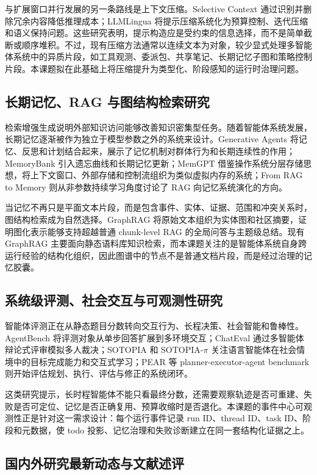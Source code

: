 \documentclass[UTF8,a4paper,zihao=-4,fontset=windows]{ctexart}
\begin{document}
与扩展窗口并行发展的另一条路线是上下文压缩。Selective Context 通过识别并删除冗余内容降低推理成本；LLMLingua 将提示压缩系统化为预算控制、迭代压缩和语义保持问题。这些研究表明，提示构造应是受约束的信息选择，而不是简单截断或顺序堆积。不过，现有压缩方法通常以连续文本为对象，较少显式处理多智能体系统中的异质片段，如工具观测、委派包、共享笔记、长期记忆子图和策略控制片段。本课题拟在此基础上将压缩提升为类型化、阶段感知的运行时治理问题。

\subsection{长期记忆、RAG 与图结构检索研究}

检索增强生成说明外部知识访问能够改善知识密集型任务。随着智能体系统发展，长期记忆逐渐被作为独立于模型参数之外的系统来设计。Generative Agents 将记忆、反思和计划结合起来，展示了记忆机制对群体行为和长期连续性的作用；MemoryBank 引入遗忘曲线和长期记忆更新；MemGPT 借鉴操作系统分层存储思想，将上下文窗口、外部存储和控制流组织为类似虚拟内存的系统；From RAG to Memory 则从非参数持续学习角度讨论了 RAG 向记忆系统演化的方向。

当记忆不再只是平面文本片段，而是包含事件、实体、证据、范围和冲突关系时，图结构检索成为自然选择。GraphRAG 将原始文本组织为实体图和社区摘要，证明图化表示能够支持超越普通 chunk-level RAG 的全局问答与主题级总结。现有 GraphRAG 主要面向静态语料库知识检索，而本课题关注的是智能体系统自身跨运行经验的结构化组织，因此图谱中的节点不是普通文档片段，而是经过治理的记忆胶囊。

\subsection{系统级评测、社会交互与可观测性研究}

智能体评测正在从静态题目分数转向交互行为、长程决策、社会智能和鲁棒性。AgentBench 将评测对象从单步回答扩展到多环境交互；ChatEval 通过多智能体辩论式评审模拟多人裁决；SOTOPIA 和 SOTOPIA-$\pi$ 关注语言智能体在社会情境中的目标完成能力和交互式学习；PEAR 等 planner-executor-agent benchmark 则开始评估规划、执行、评估与修正的系统闭环。

这类研究提示，长时程智能体不能只看最终分数，还需要观察轨迹是否可重建、失败是否可定位、记忆是否正确复用、预算收缩时是否退化。本课题的事件中心可观测性正是针对这一需求设计：每个运行事件记录 run ID、thread ID、task ID、阶段和元数据，使 todo 投影、记忆治理和失败诊断建立在同一套结构化证据之上。

\subsection{国内外研究最新动态与文献述评}
\end{document}

